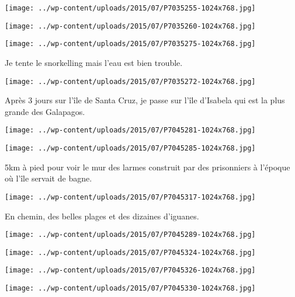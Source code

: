  \newline
\centerline{\texttt{[image: ../wp-content/uploads/2015/07/P7035255-1024x768.jpg]} } 
 \newline
 \newline
\centerline{\texttt{[image: ../wp-content/uploads/2015/07/P7035260-1024x768.jpg]} } 
 \newline
 \newline
\centerline{\texttt{[image: ../wp-content/uploads/2015/07/P7035275-1024x768.jpg]} } 
 \newline
 Je tente le snorkelling mais l'eau est bien trouble. \newline
 \newline
\centerline{\texttt{[image: ../wp-content/uploads/2015/07/P7035272-1024x768.jpg]} } 
 \newline
 Après 3 jours sur l'île de Santa Cruz, je passe sur l'île d'Isabela qui est la plus grande des Galapagos. \newline
 \newline
\centerline{\texttt{[image: ../wp-content/uploads/2015/07/P7045281-1024x768.jpg]} } 
 \newline
 \newline
\centerline{\texttt{[image: ../wp-content/uploads/2015/07/P7045285-1024x768.jpg]} } 
 \newline
 5km à pied pour voir le mur des larmes construit par des prisonniers à l'époque où l'île servait de bagne. \newline
 \newline
\centerline{\texttt{[image: ../wp-content/uploads/2015/07/P7045317-1024x768.jpg]} } 
 \newline
 En chemin, des belles plages et des dizaines d'iguanes. \newline
 \newline
\centerline{\texttt{[image: ../wp-content/uploads/2015/07/P7045289-1024x768.jpg]} } 
 \newline
 \newline
\centerline{\texttt{[image: ../wp-content/uploads/2015/07/P7045324-1024x768.jpg]} } 
 \newline
 \newline
\centerline{\texttt{[image: ../wp-content/uploads/2015/07/P7045326-1024x768.jpg]} } 
 \newline
 \newline
\centerline{\texttt{[image: ../wp-content/uploads/2015/07/P7045330-1024x768.jpg]} } 
